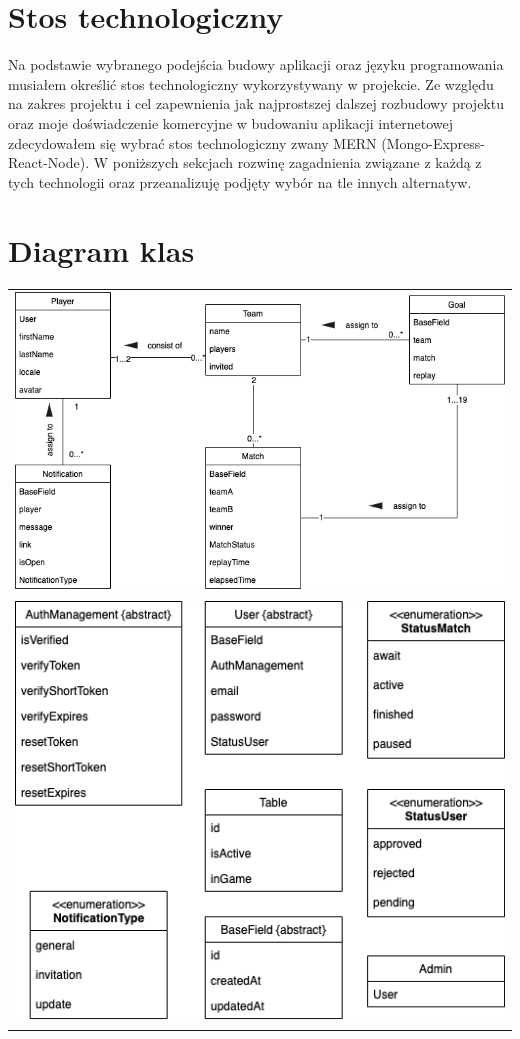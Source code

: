 \section{Stos technologiczny}
Na podstawie wybranego podejścia budowy aplikacji oraz języku programowania musiałem określić stos technologiczny wykorzystywany w projekcie.
Ze względu na zakres projektu i cel zapewnienia jak najprostszej dalszej rozbudowy projektu oraz moje doświadczenie komercyjne w budowaniu aplikacji internetowej zdecydowałem się wybrać stos technologiczny zwany MERN (Mongo-Express-React-Node). W poniższych sekcjach rozwinę zagadnienia związane z każdą z tych technologii oraz przeanalizuję podjęty wybór na tle innych alternatyw.

\section{Diagram klas}

\begin{tabular}{c}
    \includegraphics[width=\textwidth]{images/diagrams/class_diagram.png}  \\
    \includegraphics[width=\textwidth]{images/diagrams/class_diagram_rest.png}
\end{tabular}

